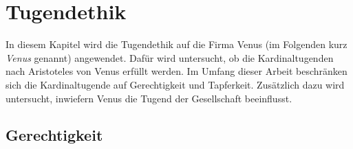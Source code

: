 \author{Autor: An-Nam Pham}
\section{Tugendethik}
In diesem Kapitel wird die Tugendethik auf die Firma Venus (im Folgenden kurz \textit{Venus} genannt) angewendet. Dafür wird untersucht, ob die Kardinaltugenden nach Aristoteles von Venus erfüllt werden. Im Umfang dieser Arbeit beschränken sich die Kardinaltugende auf Gerechtigkeit und Tapferkeit. Zusätzlich dazu wird untersucht, inwiefern Venus die Tugend der Gesellschaft beeinflusst.
\subsection{Gerechtigkeit}